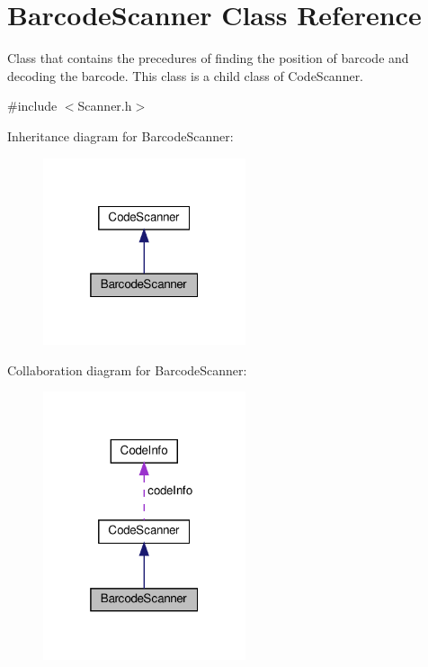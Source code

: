 \hypertarget{classBarcodeScanner}{}\section{Barcode\+Scanner Class Reference}
\label{classBarcodeScanner}


Class that contains the precedures of finding the position of barcode and decoding the barcode. This class is a child class of Code\+Scanner.  




{\ttfamily \#include $<$Scanner.\+h$>$}



Inheritance diagram for Barcode\+Scanner\+:\nopagebreak
\begin{figure}[H]
\begin{center}
\leavevmode
\includegraphics[width=169pt]{classBarcodeScanner__inherit__graph}
\end{center}
\end{figure}


Collaboration diagram for Barcode\+Scanner\+:\nopagebreak
\begin{figure}[H]
\begin{center}
\leavevmode
\includegraphics[width=169pt]{classBarcodeScanner__coll__graph}
\end{center}
\end{figure}
